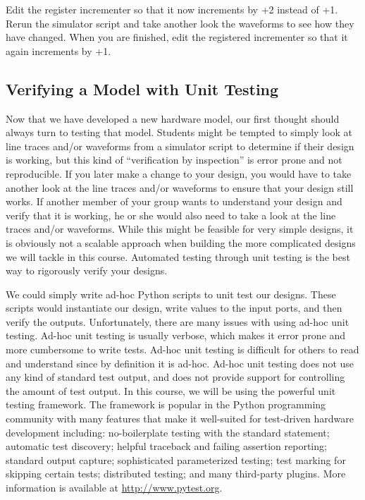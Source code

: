 \documentclass{cbxdoc}
\begin{document}


\begin{task}
  Edit the register incrementer so that it now increments by +2 instead
  of +1. Rerun the simulator script and take another look the waveforms
  to see how they have changed. When you are finished, edit the
  registered incrementer so that it again increments by +1.
\end{task}

\subsection{Verifying a Model with Unit Testing}

Now that we have developed a new hardware model, our first thought should
always turn to testing that model. Students might be tempted to simply
look at line traces and/or waveforms from a simulator script to determine
if their design is working, but this kind of ``verification by
inspection'' is error prone and not reproducible. If you later make a
change to your design, you would have to take another look at the line
traces and/or waveforms to ensure that your design still works. If
another member of your group wants to understand your design and verify
that it is working, he or she would also need to take a look at the line
traces and/or waveforms. While this might be feasible for very simple
designs, it is obviously not a scalable approach when building the more
complicated designs we will tackle in this course. Automated testing
through unit testing is the best way to rigorously verify your designs.

We could simply write ad-hoc Python scripts to unit test our designs.
These scripts would instantiate our design, write values to the input
ports, and then verify the outputs. Unfortunately, there are many issues
with using ad-hoc unit testing. Ad-hoc unit testing is usually verbose,
which makes it error prone and more cumbersome to write tests. Ad-hoc
unit testing is difficult for others to read and understand since by
definition it is ad-hoc. Ad-hoc unit testing does not use any kind of
standard test output, and does not provide support for controlling the
amount of test output. In this course, we will be using the powerful
 unit testing framework. The  framework is
popular in the Python programming community with many features that make
it well-suited for test-driven hardware development including:
no-boilerplate testing with the standard  statement; automatic
test discovery; helpful traceback and failing assertion reporting;
standard output capture; sophisticated parameterized testing; test
marking for skipping certain tests; distributed testing; and many
third-party plugins. More information is available at
\url{http://www.pytest.org}.
\end{document}
